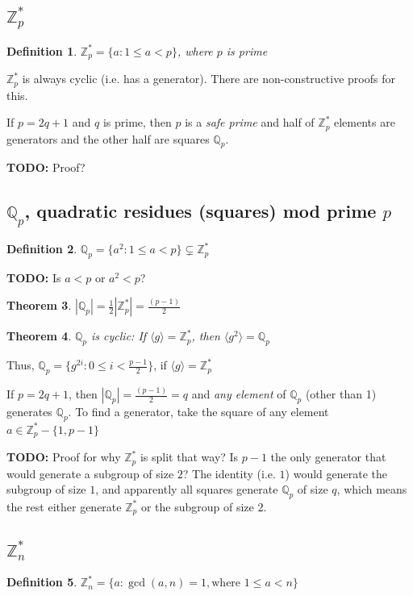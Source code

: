 \documentclass[12pt]{article}
\newtheorem{thm}{Theorem}[section]
\newtheorem{definition}[thm]{Definition}
\newcommand{\Zp}{\mathbb{Z}^{\ast}_p}
\newcommand{\Zn}{\mathbb{Z}^{\ast}_n}
\newcommand{\Qp}{\mathbb{Q}_p}
\newcommand{\gen}[1]{\langle #1 \rangle}
\newcommand{\todo}{\textbf{TODO:} }
\newcommand{\sz}[1]{\left|#1\right|}
\begin{document}
\subsection{$\Zp$}
\begin{definition}
$\Zp = \{ a : 1 \le a < p\}$, where $p$ is prime
\end{definition}

$\Zp$ is always cyclic (i.e. has a generator). There are non-constructive proofs
for this.

If $p = 2q + 1$ and $q$ is prime, then $p$ is a \emph{safe prime} and half of
$\Zp$ elements are generators and the other half are squares $\Qp$.

\todo Proof?

\subsection{$\Qp$, quadratic residues (squares) mod prime $p$}
\begin{definition}
$\Qp = \{a^2 : 1 \le a < p\} \subsetneq \Zp$
\end{definition}

\todo Is $a < p$ or $a^2 < p$?

\begin{thm}
$|\Qp| = \frac{1}{2}\sz{\Zp} = \frac{(p-1)}{2}$
\end{thm}

\begin{thm}
$\Qp$ is cyclic: If $\gen{g} = \Zp$, then $\gen{g^2} = \Qp$
\end{thm}

Thus, $\Qp = \{g^{2i} : 0 \le i < \frac{p-1}{2}\}$, if $\gen{g} = \Zp$

If $p = 2q + 1$, then $\sz{\Qp} = \frac{(p-1)}{2} = q$ and \emph{any element} of
$\Qp$ (other than 1) generates $\Qp$. To find a generator, take the square of
any element $a \in \Zp - \{1, p-1\}$

\todo Proof for why $\Zp$ is split that way? Is $p-1$ the only generator
that would generate a subgroup of size $2$? The identity (i.e. $1$) would generate
the subgroup of size $1$, and apparently all squares generate $\Qp$ of size $q$,
which means the rest either generate $\Zp$ or the subgroup of size $2$.

\subsection{$\Zn$}

\begin{definition}
$\Zn = \{a : \gcd(a, n) = 1, \text{where } 1 \le a < n\}$
\end{definition}
\end{document}
